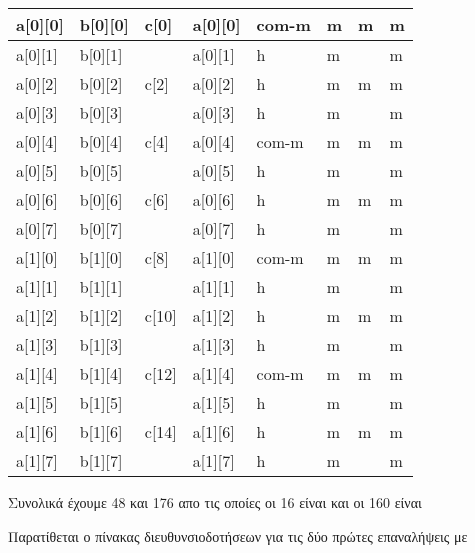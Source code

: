 \documentclass[10pt]{assignment}f
\begin{document}
\begin{center}
\begin{tabularx}{\textwidth}{|Z|Z|Z|Z|Y|Y|Y|Y|}
\hline
a[0][0] & b[0][0] & c[0] & a[0][0] & com-m & m & m & m \\
\hline
a[0][1] & b[0][1] &      & a[0][1] & h & m & & m \\
\hline
a[0][2] & b[0][2] & c[2] & a[0][2] & h & m & m & m \\
\hline
a[0][3] & b[0][3] &      & a[0][3] & h & m & & m \\
\hline
a[0][4] & b[0][4] & c[4] & a[0][4] & com-m & m & m & m \\
\hline
a[0][5] & b[0][5] &      & a[0][5] & h & m & & m \\
\hline
a[0][6] & b[0][6] & c[6] & a[0][6] & h & m & m & m \\
\hline
a[0][7] & b[0][7] &      & a[0][7] & h & m & & m \\
\hline
a[1][0] & b[1][0] & c[8] & a[1][0] & com-m & m & m & m \\
\hline
a[1][1] & b[1][1] &      & a[1][1] & h & m & & m \\
\hline
a[1][2] & b[1][2] & c[10] & a[1][2] & h & m & m & m \\
\hline
a[1][3] & b[1][3] &       & a[1][3] & h & m & & m \\
\hline
a[1][4] & b[1][4] & c[12] & a[1][4] & com-m & m & m & m \\
\hline
a[1][5] & b[1][5] &       & a[1][5] & h & m & & m \\
\hline
a[1][6] & b[1][6] & c[14] & a[1][6] & h & m & m & m \\
\hline
a[1][7] & b[1][7] &       & a[1][7] & h & m & & m \\
\hline
\end{tabularx}
\end{center}
\vspace{4pt}

Συνολικά έχουμε 48  και 176  απο τις οποίες οι 16 είναι  και 
οι 160 είναι 

\newpage
Παρατίθεται ο πίνακας διευθυνσιοδοτήσεων για τις δύο πρώτες επαναλήψεις με 
\end{document}
